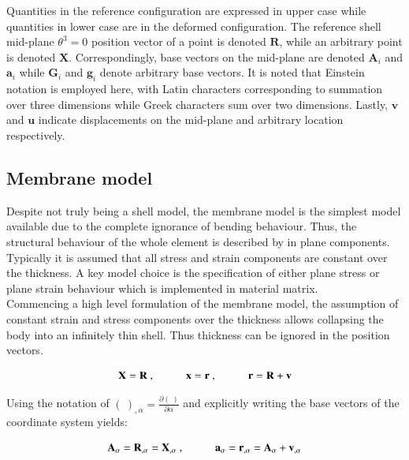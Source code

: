 Quantities in the reference configuration are expressed in upper case while quantities in lower case are in the deformed configuration. The reference shell mid-plane $\theta^3 = 0$ position vector of a point is denoted $\mathbf{R}$, while an arbitrary point is denoted $\mathbf{X}$. Correspondingly, base vectors on the mid-plane are denoted $\mathbf{A}_i$ and $\mathbf{a}_i$ while $\mathbf{G}_i$ and $\mathbf{g}_i$ denote arbitrary base vectors. It is noted that Einstein notation is employed here, with Latin characters corresponding to summation over three dimensions while Greek characters sum over two dimensions. Lastly, $\mathbf{v}$ and $\mathbf{u}$ indicate displacements on the mid-plane and arbitrary location respectively.


\subsection{Membrane model}

Despite not truly being a shell model, the membrane model is the simplest model available due to the complete ignorance of bending behaviour. Thus, the structural behaviour of the whole element is described by in plane components. Typically it is assumed that all stress and strain components are constant over the thickness. A key model choice is the specification of either plane stress or plane strain behaviour which is implemented in material matrix. \\

Commencing a high level formulation of the membrane model, the assumption of constant strain and stress components over the thickness allows collapsing the body into an infinitely thin shell. Thus thickness can be ignored in the position vectors.

\begin{equation} 
\mathbf{X} = \mathbf{R}\ ,
\hspace{10mm}
\mathbf{x} = \mathbf{r}\ ,
\hspace{10mm}
\mathbf{r} = \mathbf{R} + \mathbf{v}
\label{eqsmem1a}
\end{equation}

Using the notation of $(\ )_{,\alpha} = \frac{\partial(\ )}{\partial	\alpha}$ and explicitly writing the base vectors of the coordinate system yields:

\begin{equation} 
\mathbf{A}_\alpha  = \mathbf{R}_{,\alpha} =  \mathbf{X}_{,\alpha}
\ ,
\hspace{10mm}
\mathbf{a}_\alpha  = \mathbf{r}_{,\alpha} = \mathbf{A}_\alpha + \mathbf{v}_{,\alpha}
\label{eqsmem1b}
\end{equation}

